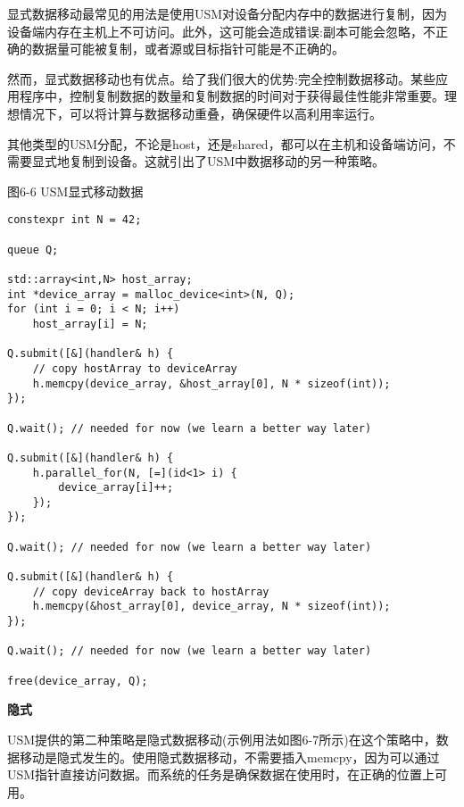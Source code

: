 显式数据移动最常见的用法是使用USM对设备分配内存中的数据进行复制，因为设备端内存在主机上不可访问。此外，这可能会造成错误:副本可能会忽略，不正确的数据量可能被复制，或者源或目标指针可能是不正确的。\par

然而，显式数据移动也有优点。给了我们很大的优势:完全控制数据移动。某些应用程序中，控制复制数据的数量和复制数据的时间对于获得最佳性能非常重要。理想情况下，可以将计算与数据移动重叠，确保硬件以高利用率运行。\par

其他类型的USM分配，不论是host，还是shared，都可以在主机和设备端访问，不需要显式地复制到设备。这就引出了USM中数据移动的另一种策略。\par

\hspace*{\fill} \par %
图6-6 USM显式移动数据
\begin{lstlisting}[caption={}]
constexpr int N = 42;

queue Q;

std::array<int,N> host_array;
int *device_array = malloc_device<int>(N, Q);
for (int i = 0; i < N; i++)
	host_array[i] = N;

Q.submit([&](handler& h) {
	// copy hostArray to deviceArray
	h.memcpy(device_array, &host_array[0], N * sizeof(int));
});

Q.wait(); // needed for now (we learn a better way later)

Q.submit([&](handler& h) {
	h.parallel_for(N, [=](id<1> i) {
		device_array[i]++;
	});
});

Q.wait(); // needed for now (we learn a better way later)

Q.submit([&](handler& h) {
	// copy deviceArray back to hostArray
	h.memcpy(&host_array[0], device_array, N * sizeof(int));
});

Q.wait(); // needed for now (we learn a better way later)

free(device_array, Q);
\end{lstlisting}

\hspace*{\fill} \par %
\textbf{隐式}

USM提供的第二种策略是隐式数据移动(示例用法如图6-7所示)在这个策略中，数据移动是隐式发生的。使用隐式数据移动，不需要插入memcpy，因为可以通过USM指针直接访问数据。而系统的任务是确保数据在使用时，在正确的位置上可用。\par

